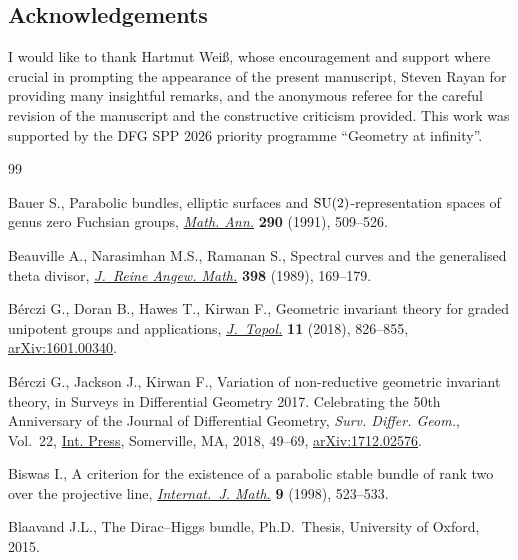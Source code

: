 \documentclass[10pt,a4paper]{amsart}
\numberwithin{equation}{section}
\begin{document}
\subsection*{Acknowledgements}

I would like to thank Hartmut Wei\ss, whose encouragement and support where crucial in promp\-ting the appearance of the present manuscript, Steven Rayan for providing many insightful remarks, and the anonymous referee for the careful revision of the manuscript and the constructive criticism provided. This work was supported by the DFG SPP 2026 priority programme ``Geometry at infinity''.


\begin{thebibliography}{99}
\footnotesize\itemsep=0pt

Bauer S., Parabolic bundles, elliptic surfaces and {${\rm
 SU}(2)$}-representation spaces of genus zero {F}uchsian groups, \href{https://doi.org/10.1007/BF01459257}{\textit{Math.
 Ann.}} \textbf{290} (1991), 509--526.

Beauville A., Narasimhan M.S., Ramanan S., Spectral curves and the generalised
 theta divisor, \href{https://doi.org/10.1515/crll.1989.398.169}{\textit{J.~Reine Angew. Math.}} \textbf{398} (1989), 169--179.

B\'erczi G., Doran B., Hawes T., Kirwan F., Geometric invariant theory for
 graded unipotent groups and applications, \href{https://doi.org/10.1112/topo.12075}{\textit{J.~Topol.}} \textbf{11}
 (2018), 826--855, \href{https://arxiv.org/abs/1601.00340}{arXiv:1601.00340}.

B\'erczi G., Jackson J., Kirwan F., Variation of non-reductive geometric
 invariant theory, in Surveys in Differential Geometry 2017. {C}elebrating the
 50th Anniversary of the {J}ournal of {D}ifferential {G}eometry, \textit{Surv.
 Differ. Geom.}, Vol.~22, \href{https://doi.org/10.4310/SDG.2017.v22.n1.a2}{Int. Press}, Somerville, MA, 2018, 49--69,
 \href{https://arxiv.org/abs/1712.02576}{arXiv:1712.02576}.

Biswas I., A criterion for the existence of a parabolic stable bundle of rank
 two over the projective line, \href{https://doi.org/10.1142/S0129167X98000233}{\textit{Internat.~J. Math.}} \textbf{9} (1998),
 523--533.

Blaavand J.L., The {D}irac--{H}iggs bundle, Ph.D.~Thesis, {U}niversity of
 Oxford, 2015.


\end{thebibliography}
\end{document}
